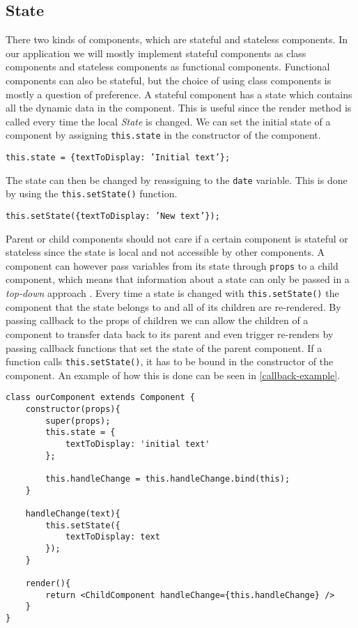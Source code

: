 \subsection*{State}
There two kinds of components, which are stateful and stateless components.
In our application we will mostly implement stateful components as class components and stateless components as functional components. 
Functional components can also be stateful, but the choice of using class components is mostly a question of preference.
A stateful component has a state which contains all the dynamic data in the component.
This is useful since the render method is called every time the local \textit{State} is changed.
We can set the initial state of a component by assigning \texttt{this.state} in the constructor of the component.
\begin{center}
    \texttt{this.state = \{textToDisplay: 'Initial text'\};}
\end{center}
The state can then be changed by reassigning to the \texttt{date} variable.
This is done by using the \texttt{this.setState()} function.
\begin{center}
    \texttt{this.setState(\{textToDisplay: 'New text'\});}
\end{center}
Parent or child components should not care if a certain component is stateful or stateless since the state is local and not accessible by other components.
A component can however pass variables from its state through \texttt{props} to a child component, which means that information about a state can only be passed in a \textit{top-down} approach \cite{ReactJS}.
Every time a state is changed with \texttt{this.setState()} the component that the state belongs to and all of its children are re-rendered.
By passing callback to the props of children we can allow  the children of a component to transfer data back to its parent and even trigger re-renders by passing callback functions that set the state of the parent component.
If a function calls \texttt{this.setState()}, it has to be bound in the constructor of the component.
An example of how this is done can be seen in \autoref{callback-example}.
\begin{lstlisting}[caption={An example of a callback function}, label={callback-example}]
class ourComponent extends Component {
	constructor(props){
		super(props);
		this.state = {
			textToDisplay: 'initial text'
		};

		this.handleChange = this.handleChange.bind(this);
	}

	handleChange(text){
		this.setState({
			textToDisplay: text
		});
	}

	render(){
		return <ChildComponent handleChange={this.handleChange} />
	}
}
\end{lstlisting}

